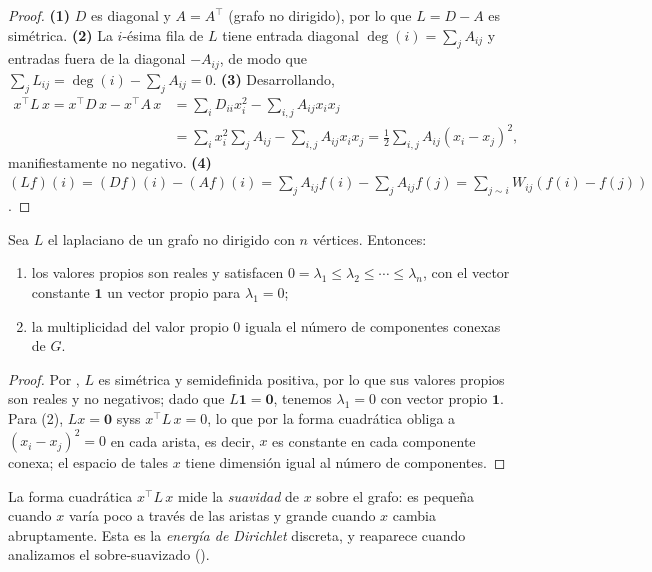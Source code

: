 \begin{proof}
\textbf{(1)} $D$ es diagonal y $A = A^\top$ (grafo no dirigido), por lo que
$L = D - A$ es sim\'etrica. \textbf{(2)} La $i$-\'esima fila de $L$ tiene entrada
diagonal $\deg(i) = \sum_j A_{ij}$ y entradas fuera de la diagonal $-A_{ij}$, de
modo que $\sum_j L_{ij} = \deg(i) - \sum_j A_{ij} = 0$. \textbf{(3)} Desarrollando,
\begin{align*}
  x^\top L\, x = x^\top D\, x - x^\top A\, x
    &= \sum_i D_{ii} x_i^2 - \sum_{i,j} A_{ij} x_i x_j \\
    &= \sum_i x_i^2 \sum_j A_{ij} - \sum_{i,j} A_{ij} x_i x_j
    = \tfrac12 \sum_{i,j} A_{ij}(x_i - x_j)^2 ,
\end{align*}
manifiestamente no negativo. \textbf{(4)}
$(Lf)(i) = (Df)(i) - (Af)(i) = \sum_j A_{ij} f(i) - \sum_j A_{ij} f(j)
= \sum_{j \sim i} W_{ij}(f(i) - f(j))$.
\end{proof}

\begin{proposition}
\label{prop:graphs:laplacian-props}
Sea $L$ el laplaciano de un grafo no dirigido con $n$ v\'ertices. Entonces:
\begin{enumerate}
  \item los valores propios son reales y satisfacen
        $0 = \lambda_1 \le \lambda_2 \le \cdots \le \lambda_n$, con el vector
        constante $\mathbf{1}$ un vector propio para $\lambda_1 = 0$;
  \item la multiplicidad del valor propio $0$ iguala el n\'umero de componentes
        conexas de $G$.
\end{enumerate}
\end{proposition}

\begin{proof}
Por , $L$ es sim\'etrica y semidefinida
positiva, por lo que sus valores propios son reales y no negativos; dado que
$L \mathbf{1} = \mathbf{0}$, tenemos $\lambda_1 = 0$ con vector propio
$\mathbf{1}$. Para (2), $L x = \mathbf{0}$ syss $x^\top L\, x = 0$, lo que por la
forma cuadr\'atica obliga a $(x_i - x_j)^2 = 0$ en cada arista, es decir, $x$ es
constante en cada componente conexa; el espacio de tales $x$ tiene dimensi\'on
igual al n\'umero de componentes.
\end{proof}

La forma cuadr\'atica $x^\top L\, x$ mide la \emph{suavidad} de $x$ sobre el
grafo: es peque\~na cuando $x$ var\'ia poco a trav\'es de las aristas y grande
cuando $x$ cambia abruptamente. Esta es la \emph{energ\'ia de Dirichlet}
discreta, y reaparece cuando analizamos el sobre-suavizado
().

